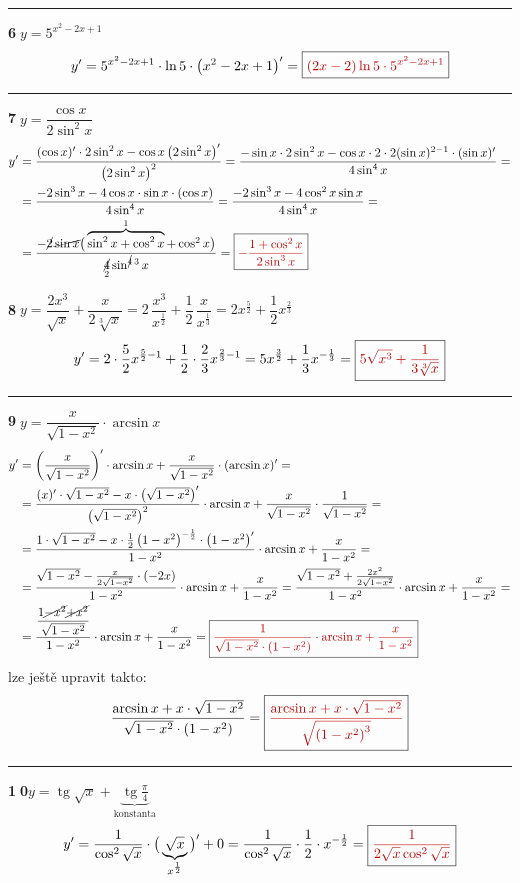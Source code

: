 \documentclass[11pt,a4paper]{article}
\newcommand{\vysl}[1]{\boxed{\color{red!75!black}#1}}
\DeclareMathOperator{\tg}{tg}
\begin{document}
\hrule
\medskip
\textbf{\textcircled{6}}\quad $y=5^{x^2-2x+1}$
\[
y' = 5^{x^2-2x+1}\cdot\ln5\cdot\left(x^2-2x+1\right)' = \vysl{(2x-2)\ln5\cdot5^{x^2-2x+1}}
\]

\hrule
\medskip
\textbf{\textcircled{7}}\quad $y=\dfrac{\cos x}{2\sin^2x}$
\begin{align*}
y' &= \frac{(\cos x)'\cdot2\sin^2x-\cos x\left(2\sin^2x\right)'}{\left(2\sin^2x\right)^2}
= \frac{-\sin x\cdot2\sin^2x-\cos x\cdot2\cdot2(\sin x)^{2-1}\cdot(\sin x)'}{4\sin^4x} =\\
&= \frac{-2\sin^3x-4\cos x\cdot\sin x\cdot(\cos x)}{4\sin^4x}
= \frac{-2\sin^3x-4\cos^2x\sin x}{4\sin^4x} =\\
&= \frac{-\cancel{2}\,\cancel{\sin x}\big(\overbrace{\sin^2x+\cos^2x}^{1}+\cos^2x\big)}{\underset{2}{\cancel{4}}\sin^{\cancel{4}\,3}x} = \vysl{-\frac{1+\cos^2x}{2\sin^3x}}
\end{align*}

\textbf{\textcircled{8}}\quad $y=\dfrac{2x^3}{\sqrt x}+\dfrac{x}{2\sqrt[3]x} = 2\,\dfrac{x^3}{x^{\frac12}}+\dfrac12\,\dfrac{x}{x^{\frac13}} = 2x^{\frac52}+\dfrac12x^{\frac23}$
\[
y' = 2\cdot\frac52x^{\frac52-1}+\frac12\cdot\frac23x^{\frac23-1} = 5x^{\frac32}+\frac13x^{-\frac13} = \vysl{5\sqrt{x^3}+\frac{1}{3\sqrt[3]x}}
\]

\hrule
\medskip
\textbf{\textcircled{9}}\quad $y=\dfrac{x}{\sqrt{1-x^2}}\cdot\arcsin x$
\begin{align*}
y' &= \left(\frac{x}{\sqrt{1-x^2}}\right)'\cdot\arcsin x+\frac{x}{\sqrt{1-x^2}}\cdot(\arcsin x)' =\\
&= \frac{(x)'\cdot\sqrt{1-x^2}-x\cdot\left(\sqrt{1-x^2}\right)'}{\left(\sqrt{1-x^2}\right)^2}\cdot\arcsin x+\frac{x}{\sqrt{1-x^2}}\cdot\frac{1}{\sqrt{1-x^2}} =\\
&= \frac{1\cdot\sqrt{1-x^2}-x\cdot\frac12\left(1-x^2\right)^{-\frac12}\cdot\left(1-x^2\right)'}{1-x^2}\cdot\arcsin x+\frac{x}{1-x^2} =\\
&= \frac{\sqrt{1-x^2}-\frac{x}{2\sqrt{1-x^2}}\cdot(-2x)}{1-x^2}\cdot\arcsin x+\frac{x}{1-x^2}
= \frac{\sqrt{1-x^2}+\frac{2x^2}{2\sqrt{1-x^2}}}{1-x^2}\cdot\arcsin x+\frac{x}{1-x^2} =\\
&= \frac{\dfrac{1\cancel{-x^2}\cancel{+x^2}}{\sqrt{1-x^2}}}{1-x^2}\cdot\arcsin x+\frac{x}{1-x^2}
= \vysl{\frac{1}{\sqrt{1-x^2}\cdot\left(1-x^2\right)}\cdot\arcsin x+\frac{x}{1-x^2}}
\end{align*}
lze ještě upravit takto:
\[
\frac{\arcsin x+x\cdot\sqrt{1-x^2}}{\sqrt{1-x^2}\cdot\left(1-x^2\right)} = \vysl{\frac{\arcsin x+x\cdot\sqrt{1-x^2}}{\sqrt{\left(1-x^2\right)^3}}}
\]

\hrule
\medskip
\textbf{\textcircled{10}}\quad $y=\tg\sqrt x+\underbrace{\tg\frac\pi4}_{\text{konstanta}}$
\[
y' = \frac{1}{\cos^2\sqrt x}\cdot\big(\underbrace{\sqrt x}_{x^{\frac12}}\big)'+0 = \frac{1}{\cos^2\sqrt x}\cdot\frac12\cdot x^{-\frac12} = \vysl{\frac{1}{2\sqrt x\cos^2\sqrt x}}
\]
\end{document}
